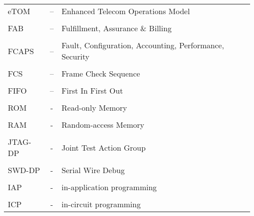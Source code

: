 \begin{tiny}
\begin{tabular}{ l c l }
		eTOM & – \hspace{1cm} & Enhanced Telecom Operations Model \\
		\\
		FAB & – \hspace{1cm} & Fulfillment, Assurance \& Billing \\
		\\
		FCAPS & – \hspace{1cm} & Fault, Configuration, Accounting, Performance, Security \\
		\\
		FCS & – \hspace{1cm} & Frame Check Sequence \\
		\\
		FIFO & – \hspace{1cm} & First In First Out \\
		\\
		ROM & - \hspace{1cm} & Read-only Memory \\
		\\
		RAM & - \hspace{1cm} & Random-access Memory \\
		\\
		JTAG-DP & - \hspace{1cm} & Joint Test Action Group \\
		\\
		SWD-DP & - \hspace{1cm} & Serial Wire Debug \\
		\\
		IAP & - \hspace{1cm} & in-application programming \\
		\\
		ICP & - \hspace{1cm} & in-circuit programming \\
	\end{tabular}
\end{tiny}
